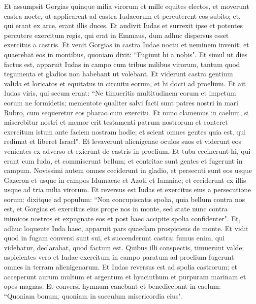 \begin{biblechapter}  
\verse Et assumpsit Gorgias quinque milia virorum et mille equites electos, et moverunt castra nocte, 
\verse ut applicarent ad castra Iudaeorum et percuterent eos subito; et, qui erant ex arce, erant illis duces. 
\verse Et audivit Iudas et surrexit ipse et potentes percutere exercitum regis, qui erat in Emmaus, 
\verse dum adhuc dispersus esset exercitus a castris. 
\verse Et venit Gorgias in castra Iudae noctu et neminem invenit; et quaerebat eos in montibus, quoniam dixit: “Fugiunt hi a nobis". 
\verse Et simul ut dies factus est, apparuit Iudas in campo cum tribus milibus virorum, tantum quod tegumenta et gladios non habebant ut volebant. 
\verse Et viderunt castra gentium valida et loricatos et equitatus in circuitu eorum, et hi docti ad proelium. 
\verse Et ait Iudas viris, qui secum erant: “Ne timueritis multitudinem eorum et impetum eorum ne formidetis; 
\verse mementote qualiter salvi facti sunt patres nostri in mari Rubro, cum sequeretur eos pharao cum exercitu. 
\verse Et nunc clamemus in caelum, si miserebitur nostri et memor erit testamenti patrum nostrorum et conteret exercitum istum ante faciem nostram hodie; 
\verse et scient omnes gentes quia est, qui redimat et liberet Israel". 
\verse Et levaverunt alienigenae oculos suos et viderunt eos venientes ex adverso  
\verse et exierunt de castris in proelium. Et tuba cecinerunt hi, qui erant cum Iuda, 
\verse et commiserunt bellum; et contritae sunt gentes et fugerunt in campum.  
\verse Novissimi autem omnes ceciderunt in gladio, et persecuti sunt eos usque Gazeron et usque in campos Idumaeae et Azoti et Iamniae; et ceciderunt ex illis usque ad tria milia virorum. 
\verse Et reversus est Iudas et exercitus eius a persecutione eorum; 
\verse dixitque ad populum: “Non concupiscatis spolia, quia bellum contra nos est, 
\verse et Gorgias et exercitus eius prope nos in monte, sed state nunc contra inimicos nostros et expugnate eos et post haec accipite spolia confidenter". 
\verse Et, adhuc loquente Iuda haec, apparuit pars quaedam prospiciens de monte. 
\verse Et vidit quod in fugam conversi sunt sui, et succenderunt castra; fumus enim, qui videbatur, declarabat, quod factum est.  
\verse Quibus illi conspectis, timuerunt valde; aspicientes vero et Iudae exercitum in campo paratum ad proelium 
\verse fugerunt omnes in terram alienigenarum.  
\verse Et Iudas reversus est ad spolia castrorum; et acceperunt aurum multum et argentum et hyacinthum et purpuram marinam et opes magnas. 
\verse Et conversi hymnum canebant et benedicebant in caelum: “Quoniam bonum, quoniam in saeculum misericordia eius". 

\end{biblechapter}
